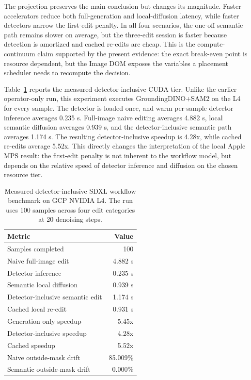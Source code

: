 \documentclass[final,5p,times,number,sort&compress]{elsarticle}
\newcommand{\imageDOM}{Image DOM}
\begin{document}
The projection preserves the main conclusion but changes its magnitude. Faster accelerators reduce both full-generation and local-diffusion latency, while faster detectors narrow the first-edit penalty. In all four scenarios, the one-off semantic path remains slower on average, but the three-edit session is faster because detection is amortized and cached re-edits are cheap. This is the compute-continuum claim supported by the present evidence: the exact break-even point is resource dependent, but the \imageDOM{} exposes the variables a placement scheduler needs to recompute the decision.

Table~\ref{tab:l4-detector-bench} reports the measured detector-inclusive CUDA tier. Unlike the earlier operator-only run, this experiment executes GroundingDINO+SAM2 on the L4 for every sample. The detector is loaded once, and warm per-sample detector inference averages 0.235 s. Full-image naive editing averages 4.882 s, local semantic diffusion averages 0.939 s, and the detector-inclusive semantic path averages 1.174 s. The resulting detector-inclusive speedup is 4.28x, while cached re-edits average 5.52x. This directly changes the interpretation of the local Apple MPS result: the first-edit penalty is not inherent to the workflow model, but depends on the relative speed of detector inference and diffusion on the chosen resource tier.

\begin{table}[t]
\centering
\scriptsize
\caption{Measured detector-inclusive SDXL workflow benchmark on GCP NVIDIA L4. The run uses 100 samples across four edit categories at 20 denoising steps.}
\label{tab:l4-detector-bench}
\begin{tabular}{lr}
\toprule
Metric & Value \\
\midrule
Samples completed & 100 \\
Naive full-image edit & 4.882 s \\
Detector inference & 0.235 s \\
Semantic local diffusion & 0.939 s \\
Detector-inclusive semantic edit & 1.174 s \\
Cached local re-edit & 0.931 s \\
Generation-only speedup & 5.45x \\
Detector-inclusive speedup & 4.28x \\
Cached speedup & 5.52x \\
Naive outside-mask drift & 85.009\% \\
Semantic outside-mask drift & 0.000\% \\
\bottomrule
\end{tabular}
\end{table}
\end{document}
